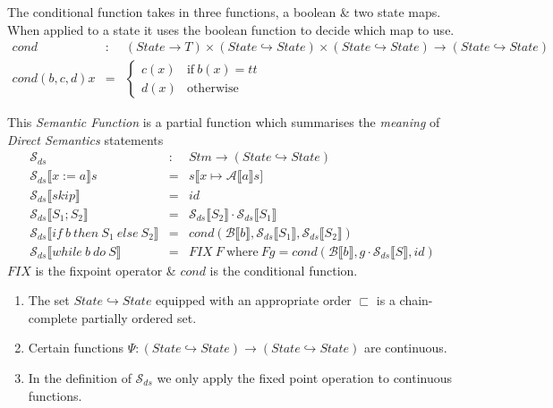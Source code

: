 \documentclass[11pt,a4paper]{article}
\begin{document}
The conditional function takes in three functions, a boolean \& two state maps. When applied to a state it uses the boolean function to decide which map to use.
\[\begin{array}{rcl}
cond&:&(State\to T)\times(State\hookrightarrow State)\times(State\hookrightarrow State)\to(State\hookrightarrow State)\\
cond(b,c,d)x&=&\begin{cases}c(x)&\mathrm{if}\ b(x)=tt\\d(x)&\mathrm{otherwise}\end{cases}
\end{array}\]

This \textit{Semantic Function} is a partial function which summarises the \textit{meaning} of \textit{Direct Semantics} statements
\[\begin{array}{lcl}
\mathcal{S}_{ds}&:&Stm\to(State\hookrightarrow State)\\
\mathcal{S}_{ds}\llbracket x:=a\rrbracket s&=&s\llbracket x\mapsto\mathcal{A}\llbracket a\rrbracket s]\\
\mathcal{S}_{ds}\llbracket skip\rrbracket&=&id\\
\mathcal{S}_{ds}\llbracket S_1;S_2\rrbracket&=&\mathcal{S}_{ds}\llbracket S_2\rrbracket\cdot\mathcal{S}_{ds}\llbracket S_1\rrbracket\\
\mathcal{S}_{ds}\llbracket if\ b\ then\ S_1\ else\ S_2\rrbracket&=&cond(\mathcal{B}\llbracket b\rrbracket,\mathcal{S}_{ds}\llbracket S_1\rrbracket,\mathcal{S}_{ds}\llbracket S_2\rrbracket)\\
\mathcal{S}_{ds}\llbracket while\ b\ do\ S\rrbracket &=& FIX\ F\ \mathrm{where}\ F g=cond(\mathcal{B}\llbracket b\rrbracket,g\cdot\mathcal{S}_{ds}\llbracket S\rrbracket,id)
\end{array}\]
\NB $FIX$ is the fixpoint operator \& $cond$ is the conditional function.\\

\begin{enumerate}
	\item The set $State\hookrightarrow State$ equipped with an appropriate order $\sqsubset$ is a chain-complete partially ordered set.
	\item Certain functions $\Psi:(State\hookrightarrow State)\to(State\hookrightarrow State)$ are continuous.
	\item In the definition of $\mathcal{S}_{ds}$ we only apply the fixed point operation to continuous functions.
\end{enumerate}
\end{document}

